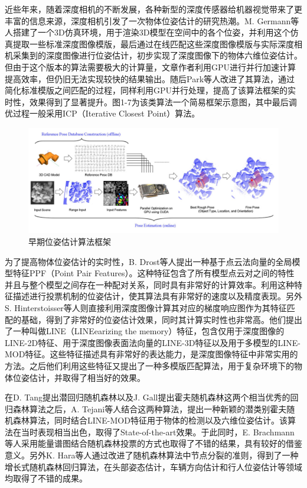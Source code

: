 近些年来，随着深度相机的不断发展，各种新型的深度传感器给机器视觉带来了更丰富的信息来源，深度相机引发了一次物体位姿估计的研究热潮。M. Germann等人搭建了一个3D仿真环境，用于渲染3D模型在空间中的各个位姿，并利用这个仿真提取一些标准深度图像模版，最后通过在线匹配这些深度图像模版与实际深度相机采集到的深度图像进行位姿估计，初步实现了深度图像下的物体六维位姿估计\cite{germann2007automatic}。但由于这个版本的算法需要极大的计算量，文章作者利用GPU进行并行加速计算提高效率，但仍旧无法实现较快的结果输出。随后Park等人改进了其算法，通过简化标准模版之间匹配的过程，同样利用GPU并行处理，提高了该算法框架的实时性，效果得到了显著提升\cite{park2010fast}。图1-7为该类算法一个简易框架示意图，其中最后调优过程一般采用ICP（Iterative Closest Point）算法。
\begin{figure}[htb]
	\centering 
	\includegraphics[width=\textwidth]{./mypic/早期位姿估计算法框架.jpg} 
	\caption{早期位姿估计算法框架} 
\end{figure}

为了提高物体位姿估计的实时性，B. Drost等人提出一种基于点云法向量的全局模型特征PPF（Point Pair Features）。这种特征包含了所有模型点云对之间的特性并且与整个模型之间存在一种配对关系，同时具有非常好的计算效率\cite{drost2010model}。利用这种特征描述进行投票机制的位姿估计，使其算法具有非常好的速度以及精度表现。另外S. Hinterstoisser等人则直接利用深度图像计算其对应的梯度响应图作为其特征匹配的基础，得到了非常好的位姿估计效果，同时其计算实时性也非常高\cite{hinterstoisser2012gradient}。他们提出了一种叫做LINE（LINEearizing the memory）特征，包含仅用于深度图像的LINE-2D特征、用于深度图像表面法向量的LINE-3D特征以及用于多模型的LINE-MOD特征。这些特征描述具有非常好的表达能力，是深度图像特征中非常实用的方法。之后他们利用这些特征又提出了一种多模版匹配算法，用于复杂环境下的物体位姿估计，并取得了相当好的效果\cite{hinterstoisser2011multimodal}。

在D. Tang提出潜回归随机森林\cite{tang2014latent}以及J. Gall提出霍夫随机森林\cite{gall2011hough}这两个相当优秀的回归森林算法之后，A. Tejani等人结合这两种算法，提出一种新颖的潜类别霍夫随机森林算法，同时结合LINE-MOD特征用于物体的检测以及六维位姿估计\cite{tejani2014latent}。该算法在当时表现相当出色，取得了State-of-the-art效果。于此同时，E. Brachmann等人采用能量谱图结合随机森林投票的方式也取得了不错的结果，具有较好的借鉴意义\cite{brachmann2014learning}。另外K. Hara等人通过改进了随机森林算法中节点分裂的准则，得到了一种增长式随机森林回归算法，在头部姿态估计，车辆方向估计和行人位姿估计等领域均取得了不错的成果\cite{hara2017growing}。


